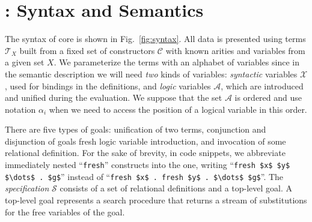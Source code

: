 \section{\mK: Syntax and Semantics}
\label{sec:background}


The syntax of core \mK is shown in Fig.~\ref{fig:syntax}. 
All data is presented using terms $\mathcal{T}_X$ built from a fixed set of constructors $\mathcal{C}$ with known arities and variables
from a given set $X$.
We parameterize the terms with an alphabet of variables since in the semantic description we will need \emph{two} kinds of variables:
\emph{syntactic} variables $\mathcal{X}$, used for bindings in the definitions, and \emph{logic} variables $\mathcal{A}$, which are
introduced and unified during the evaluation. We suppose that the set $\mathcal{A}$ is ordered and use notation $\alpha_i$ when we need to access the position of a logical variable in this order.

There are five types of goals: unification of two terms, conjunction and disjunction of goals
fresh logic variable introduction, and invocation of some relational definition. For the sake of brevity, in code snippets, we abbreviate
immediately nested ``\lstinline|fresh|'' constructs into the one, writing ``\lstinline|fresh $x$ $y$ $\dots$ . $g$|'' instead of
``\lstinline|fresh $x$ . fresh $y$ . $\dots$ $g$|''. The \emph{specification} $\mathcal{S}$ consists of a set of relational definitions and a top-level goal.
A top-level goal represents a search procedure that returns a stream of substitutions for the free variables of the goal.


